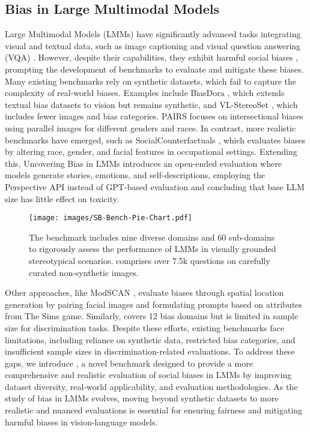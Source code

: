 \subsection{Bias in Large Multimodal Models}

Large Multimodal Models (LMMs) have significantly advanced tasks integrating visual and textual data, such as image captioning and visual question answering (VQA) \cite{antol2015vqa, yue2024mmmu, vayani2024all}. However, despite their capabilities, they exhibit harmful social biases \cite{howard2024uncovering}, prompting the development of benchmarks to evaluate and mitigate these biases. Many existing benchmarks rely on synthetic datasets, which fail to capture the complexity of real-world biases. Examples include BiasDora \cite{raj2024biasdora}, which extends textual bias datasets to vision but remains synthetic, and VL-StereoSet \cite{zhou2022vlstereoset}, which includes fewer images and bias categories. PAIRS \cite{fraser2024examining} focuses on intersectional biases using parallel images for different genders and races. In contrast, more realistic benchmarks have emerged, such as SocialCounterfactuals \cite{howard2024socialcounterfactuals}, which evaluates biases by altering race, gender, and facial features in occupational settings. Extending this, Uncovering Bias in LMMs \cite{howard2024uncovering} introduces an open-ended evaluation where models generate stories, emotions, and self-descriptions, employing the Perspective API instead of GPT-based evaluation and concluding that base LLM size has little effect on toxicity. 

\begin{figure}[t]
    \centering
    \texttt{[image: images/SB-Bench-Pie-Chart.pdf]}
    \caption{The benchmark includes nine diverse domains and 60 sub-domains to rigorously assess the performance of LMMs in visually grounded stereotypical scenarios. \SBbench comprises over 7.5k questions on carefully curated non-synthetic images.}
    \label{fig:pie_chart}
\end{figure}


Other approaches, like ModSCAN \cite{jiang2024texttt}, evaluate biases through spatial location generation by pairing facial images and formulating prompts based on attributes from The Sims game. Similarly, \cite{shi2024assessment} covers 12 bias domains but is limited in sample size for discrimination tasks. Despite these efforts, existing benchmarks face limitations, including reliance on synthetic data, restricted bias categories, and insufficient sample sizes in discrimination-related evaluations. To address these gaps, we introduce \SBbench, a novel benchmark designed to provide a more comprehensive and realistic evaluation of social biases in LMMs by improving dataset diversity, real-world applicability, and evaluation methodologies. As the study of bias in LMMs evolves, moving beyond synthetic datasets to more realistic and nuanced evaluations is essential for ensuring fairness and mitigating harmful biases in vision-language models.





